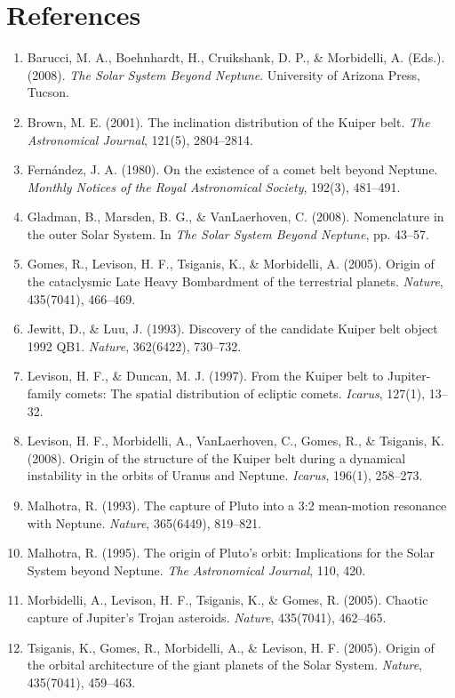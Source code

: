 \documentclass[11pt,a4paper]{article}
\begin{document}
\section*{References}
\begin{enumerate}
    \item Barucci, M. A., Boehnhardt, H., Cruikshank, D. P., \& Morbidelli, A. (Eds.). (2008). \textit{The Solar System Beyond Neptune}. University of Arizona Press, Tucson.
    \item Brown, M. E. (2001). The inclination distribution of the Kuiper belt. \textit{The Astronomical Journal}, 121(5), 2804--2814.
    \item Fern{\'a}ndez, J. A. (1980). On the existence of a comet belt beyond Neptune. \textit{Monthly Notices of the Royal Astronomical Society}, 192(3), 481--491.
    \item Gladman, B., Marsden, B. G., \& VanLaerhoven, C. (2008). Nomenclature in the outer Solar System. In \textit{The Solar System Beyond Neptune}, pp. 43--57.
    \item Gomes, R., Levison, H. F., Tsiganis, K., \& Morbidelli, A. (2005). Origin of the cataclysmic Late Heavy Bombardment of the terrestrial planets. \textit{Nature}, 435(7041), 466--469.
    \item Jewitt, D., \& Luu, J. (1993). Discovery of the candidate Kuiper belt object 1992 QB1. \textit{Nature}, 362(6422), 730--732.
    \item Levison, H. F., \& Duncan, M. J. (1997). From the Kuiper belt to Jupiter-family comets: The spatial distribution of ecliptic comets. \textit{Icarus}, 127(1), 13--32.
    \item Levison, H. F., Morbidelli, A., VanLaerhoven, C., Gomes, R., \& Tsiganis, K. (2008). Origin of the structure of the Kuiper belt during a dynamical instability in the orbits of Uranus and Neptune. \textit{Icarus}, 196(1), 258--273.
    \item Malhotra, R. (1993). The capture of Pluto into a 3:2 mean-motion resonance with Neptune. \textit{Nature}, 365(6449), 819--821.
    \item Malhotra, R. (1995). The origin of Pluto's orbit: Implications for the Solar System beyond Neptune. \textit{The Astronomical Journal}, 110, 420.
    \item Morbidelli, A., Levison, H. F., Tsiganis, K., \& Gomes, R. (2005). Chaotic capture of Jupiter's Trojan asteroids. \textit{Nature}, 435(7041), 462--465.
    \item Tsiganis, K., Gomes, R., Morbidelli, A., \& Levison, H. F. (2005). Origin of the orbital architecture of the giant planets of the Solar System. \textit{Nature}, 435(7041), 459--463.
\end{enumerate}
\end{document}

